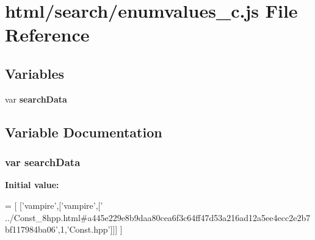 \section{html/search/enumvalues\-\_\-c.js File Reference}
\label{enumvalues__c_8js}
\subsection*{Variables}
\begin{DoxyCompactItemize}
\item 
var {\bf search\-Data}
\end{DoxyCompactItemize}


\subsection{Variable Documentation}
\subsubsection[{search\-Data}]{\setlength{\rightskip}{0pt plus 5cm}var search\-Data}\label{enumvalues__c_8js_ad01a7523f103d6242ef9b0451861231e}
{\bfseries Initial value\-:}
\begin{DoxyCode}
=
[
  [\textcolor{stringliteral}{'vampire'},[\textcolor{stringliteral}{'vampire'},[\textcolor{stringliteral}{'
      ../Const\_8hpp.html#a445e229e8b9daa80cea6f3c64ff47d53a216ad12a5ee4ecc2e2b7bf117984ba06'},1,\textcolor{stringliteral}{'Const.hpp'}]]]
]
\end{DoxyCode}
